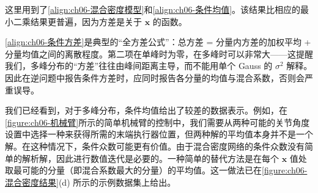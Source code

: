 \documentclass[../../main.tex]{subfiles}
\begin{document}
这里用到了\eqref{align:ch06-混合密度模型}和\eqref{align:ch06-条件均值}。该结果比相应的最小二乘结果更普遍，因为方差是关于 $\boldsymbol{x}$ 的函数。

\begin{remark}\eqref{align:ch06-条件方差}是典型的“全方差公式”：总方差 = 分量内方差的加权平均 + 分量均值之间的离散程度。第二项在单峰时为零，在多峰时可以非常大——这提醒我们，多峰分布的“方差”往往由峰间距离主导，而不能用单个 Gauss 的 $\sigma^{2}$ 解释。因此在逆问题中报告条件方差时，应同时报告各分量的均值与混合系数，否则会严重误导。
\end{remark}

我们已经看到，对于多峰分布，条件均值给出了较差的数据表示。例如，在\cref{figure:ch06-机械臂}所示的简单机械臂的控制中，我们需要从两种可能的关节角度设置中选择一种来获得所需的末端执行器位置，但两种解的平均值本身并不是一个解。在这种情况下，条件众数可能更有价值。由于混合密度网络的条件众数没有简单的解析解，因此进行数值迭代是必要的。一种简单的替代方法是在每个 $\boldsymbol{x}$ 值处取最可能的分量（即混合系数最大的分量）的平均值。这一做法已在\cref{figure:ch06-混合密度结果}(d) 所示的示例数据集上给出。
\end{document}
